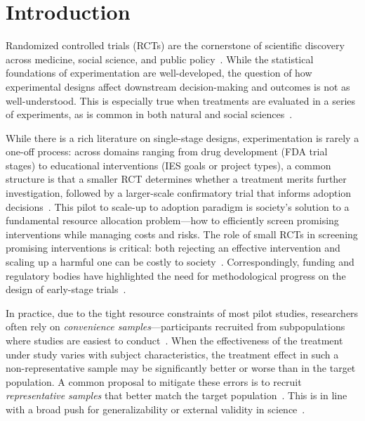 \section{Introduction}
\label{sec:introduction}

Randomized controlled trials (RCTs) are the cornerstone of scientific discovery across medicine, social science, and public policy~\cite{ImbensRu15}.
While the statistical foundations of experimentation are well-developed, the question of how experimental designs affect downstream decision-making and outcomes is not as well-understood.
This is especially true when treatments are evaluated in a series of experiments, as is common in both natural and social sciences~\cite{ChenWi13,KasySa21}.

While there is a rich literature on single-stage designs, experimentation is rarely a one-off process: across domains ranging from drug development (FDA trial stages) to educational interventions (IES goals or project types), a common structure is that a smaller RCT determines whether a treatment merits further investigation, followed by a larger-scale confirmatory trial that informs adoption decisions~\cite{FDACD22,DepartmentofEducationBo22}.
This pilot to scale-up to adoption paradigm is society's solution to a fundamental resource allocation problem---how to efficiently screen promising interventions while managing costs and risks.
The role of small RCTs in screening promising interventions is critical: both rejecting an effective intervention and scaling up a harmful one can be costly to society~\cite{RossellMu07}.
Correspondingly, funding and regulatory bodies have highlighted the need for methodological progress on the design of early-stage trials~\cite{Tipton21,FDAHH20,DepartmentofEducationBo22}.

In practice, due to the tight resource constraints of most pilot studies, researchers often rely on \emph{convenience samples}---participants recruited from subpopulations where studies are easiest to conduct~\cite{TiptonSp21}.
When the effectiveness of the treatment under study varies with subject characteristics, the treatment effect in such a non-representative sample may be significantly better or worse than in the target population.
A common proposal to mitigate these errors is to recruit \emph{representative samples} that better match the target population~\cite{FDAHH20,DepartmentofEducationBo22}.
This is in line with a broad push for generalizability or external validity in science~\cite{EgamiHa23, BryanTi21, Rothwell05, HenrichHe10, VoelklVo18}.

